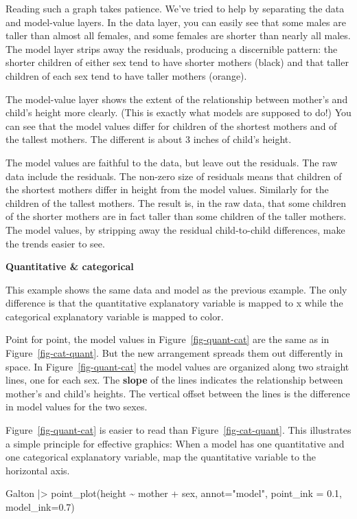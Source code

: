 \documentclass[
  letterpaper,
  DIV=11,
  numbers=noendperiod,
  oneside]{scrartcl}
\newenvironment{Shaded}{\begin{snugshade}}{\end{snugshade}}
\newcommand{\AttributeTok}[1]{\textcolor[rgb]{0.40,0.45,0.13}{#1}}
\newcommand{\FloatTok}[1]{\textcolor[rgb]{0.68,0.00,0.00}{#1}}
\newcommand{\FunctionTok}[1]{\textcolor[rgb]{0.28,0.35,0.67}{#1}}
\newcommand{\NormalTok}[1]{\textcolor[rgb]{0.00,0.23,0.31}{#1}}
\newcommand{\SpecialCharTok}[1]{\textcolor[rgb]{0.37,0.37,0.37}{#1}}
\newcommand{\StringTok}[1]{\textcolor[rgb]{0.13,0.47,0.30}{#1}}
\begin{document}
Reading such a graph takes patience. We've tried to help by separating
the data and model-value layers. In the data layer, you can easily see
that some males are taller than almost all females, and some females are
shorter than nearly all males. The model layer strips away the
residuals, producing a discernible pattern: the shorter children of
either sex tend to have shorter mothers (black) and that taller children
of each sex tend to have taller mothers (orange).

The model-value layer shows the extent of the relationship between
mother's and child's height more clearly. (This is exactly what models
are supposed to do!) You can see that the model values differ for
children of the shortest mothers and of the tallest mothers. The
different is about 3 inches of child's height.

The model values are faithful to the data, but leave out the residuals.
The raw data include the residuals. The non-zero size of residuals means
that children of the shortest mothers differ in height from the model
values. Similarly for the children of the tallest mothers. The result
is, in the raw data, that some children of the shorter mothers are in
fact taller than some children of the taller mothers. The model values,
by stripping away the residual child-to-child differences, make the
trends easier to see.

\textbf{Quantitative \& categorical}

This example shows the same data and model as the previous example. The
only difference is that the quantitative explanatory variable is mapped
to x while the categorical explanatory variable is mapped to color.

Point for point, the model values in Figure~\ref{fig-quant-cat} are the
same as in Figure~\ref{fig-cat-quant}. But the new arrangement spreads
them out differently in space. In Figure~\ref{fig-quant-cat} the model
values are organized along two straight lines, one for each sex. The
\textbf{slope} of the lines indicates the relationship between mother's
and child's heights. The vertical offset between the lines is the
difference in model values for the two sexes.

Figure~\ref{fig-quant-cat} is easier to read than
Figure~\ref{fig-cat-quant}. This illustrates a simple principle for
effective graphics: When a model has one quantitative and one
categorical explanatory variable, map the quantitative variable to the
horizontal axis.

\begin{Shaded}
\begin{Highlighting}[]
\NormalTok{Galton }\SpecialCharTok{|\textgreater{}} 
  \FunctionTok{point\_plot}\NormalTok{(height }\SpecialCharTok{\textasciitilde{}}\NormalTok{ mother }\SpecialCharTok{+}\NormalTok{ sex, }\AttributeTok{annot=}\StringTok{"model"}\NormalTok{, }
             \AttributeTok{point\_ink =} \FloatTok{0.1}\NormalTok{, }\AttributeTok{model\_ink=}\FloatTok{0.7}\NormalTok{)}
\end{Highlighting}
\end{Shaded}
\end{document}
